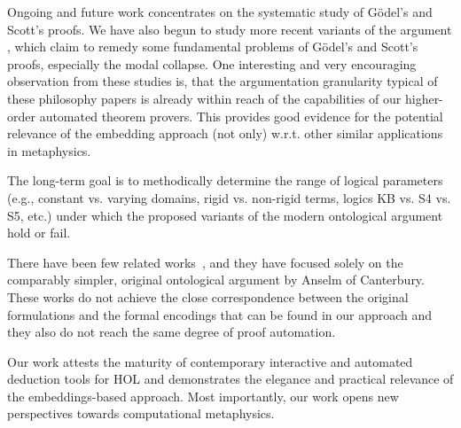 \documentclass{llncs}
\begin{document}
Ongoing and future work concentrates on the systematic study of
G\"odel's and Scott's proofs. We have also begun to study more recent
variants of the argument
\cite{anderson90:_some_emend_of_goedel_ontol_proof,AndersonGettings,bjordal99,fuhrmann05:_exist_notwen,fitting02:_types_tableaus_god,Hajek2002,Hajek2008},
which claim to remedy some fundamental problems of G\"odel's and
Scott's proofs, especially the modal collapse.  One interesting
and very encouraging observation from these studies is, that the
argumentation granularity typical of these philosophy
papers is already within reach of the capabilities 
of our higher-order automated theorem provers.
This provides good evidence for the potential 
relevance of the embedding approach (not only) w.r.t. 
other similar applications in metaphysics.


The long-term goal
is to methodically determine the range of logical parameters (e.g.,
constant vs. varying domains, rigid vs. non-rigid terms, logics KB vs.
S4 vs. S5, etc.) under which the proposed variants of the modern
ontological argument hold or fail.

There have been few related works~\cite{oppenheimera11,rushby13}, 
and they have
focused solely on the comparably simpler, original ontological
argument by Anselm of Canterbury. These works do not achieve the
close correspondence between the original formulations and the formal
encodings that can be found in our approach and they also do not reach
the same degree of proof automation.

Our work attests the maturity of contemporary interactive and
automated deduction tools for HOL and
demonstrates the elegance and practical relevance of the
embeddings-based approach. Most importantly, our work opens new
perspectives towards computational metaphysics.






%
\end{document}
